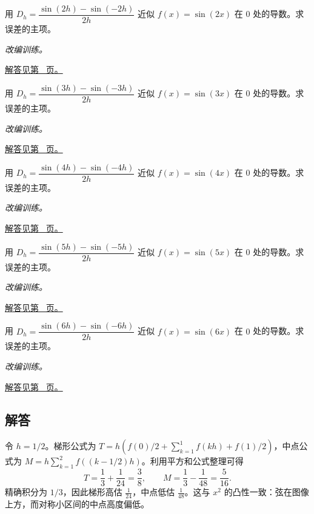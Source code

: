 \documentclass[12pt,fontset=fandol]{ctexart}
\begin{document}
\begin{example}[中心差分的截断误差]\label{ex:c18q20}
用 $D_h=\dfrac{\sin(2h)-\sin(-2h)}{2h}$ 近似 $f(x)=\sin(2x)$ 在 $0$ 处的导数。求误差的主项。
\par\textit{改编训练。}\par\hyperref[ans:c18q20]{解答见第~\pageref{ans:c18q20} 页。}
\end{example}
\begin{example}[中心差分的截断误差]\label{ex:c18q21}
用 $D_h=\dfrac{\sin(3h)-\sin(-3h)}{2h}$ 近似 $f(x)=\sin(3x)$ 在 $0$ 处的导数。求误差的主项。
\par\textit{改编训练。}\par\hyperref[ans:c18q21]{解答见第~\pageref{ans:c18q21} 页。}
\end{example}
\begin{example}[中心差分的截断误差]\label{ex:c18q22}
用 $D_h=\dfrac{\sin(4h)-\sin(-4h)}{2h}$ 近似 $f(x)=\sin(4x)$ 在 $0$ 处的导数。求误差的主项。
\par\textit{改编训练。}\par\hyperref[ans:c18q22]{解答见第~\pageref{ans:c18q22} 页。}
\end{example}
\begin{example}[中心差分的截断误差]\label{ex:c18q23}
用 $D_h=\dfrac{\sin(5h)-\sin(-5h)}{2h}$ 近似 $f(x)=\sin(5x)$ 在 $0$ 处的导数。求误差的主项。
\par\textit{改编训练。}\par\hyperref[ans:c18q23]{解答见第~\pageref{ans:c18q23} 页。}
\end{example}
\begin{example}[中心差分的截断误差]\label{ex:c18q24}
用 $D_h=\dfrac{\sin(6h)-\sin(-6h)}{2h}$ 近似 $f(x)=\sin(6x)$ 在 $0$ 处的导数。求误差的主项。
\par\textit{改编训练。}\par\hyperref[ans:c18q24]{解答见第~\pageref{ans:c18q24} 页。}
\end{example}
\subsection{解答}
\begin{solve}\label{ans:c18q1}
令 $h=1/2$。梯形公式为 $T=h(f(0)/2+\sum_{k=1}^{1}f(kh)+f(1)/2)$，中点公式为 $M=h\sum_{k=1}^{2}f((k-1/2)h)$。利用平方和公式整理可得
\[
T=\frac13+\frac1{24}=\frac{3}{8},\qquad M=\frac13-\frac1{48}=\frac{5}{16}.
\]
精确积分为 $1/3$，因此梯形高估 $\frac{1}{24}$，中点低估 $\frac{1}{48}$。这与 $x^2$ 的凸性一致：弦在图像上方，而对称小区间的中点高度偏低。
\end{solve}
\end{document}

